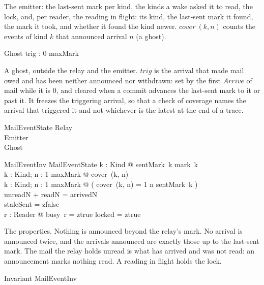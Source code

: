 \documentclass[a4paper,10pt,fleqn]{article}
\begin{document}
The emitter: the last-sent mark per kind, the kinds a wake asked it to read, the
lock, and, per reader, the reading in flight: its kind, the last-sent mark it
found, the mark it took, and whether it found the kind newer.  $cover~(k, n)$ counts the events of kind $k$
that announced arrival $n$ (a ghost).

\begin{schema}{Ghost}
  trig : 0 \upto maxMark
\end{schema}

A ghost, outside the relay and the emitter.  $trig$ is the arrival that made mail
owed and has been neither announced nor withdrawn: set by the first $Arrive$ of mail
while it is $0$, and cleared when a commit advances the last-sent mark to it or
past it.  It freezes the triggering arrival, so that a check of coverage names the
arrival that triggered it and not whichever is the latest at the end of a trace.

\begin{schema}{MailEventState}
  Relay \\
  Emitter \\
  Ghost
\end{schema}

\begin{schema}{MailEventInv}
  MailEventState
  \where
  \forall k : Kind @ sentMark~k \leq mark~k \\
  \forall k : Kind; n : 1 \upto maxMark @ cover~(k, n)  \\
  \forall k : Kind; n : 1 \upto maxMark @
    ( cover~(k, n) = 1 \implies n \leq sentMark~k ) \\
  unreadN + readN = arrivedN \\
  staleSent = zfalse \\
  \forall r : Reader @ busy~r = ztrue \implies locked = ztrue
\end{schema}

The properties.  Nothing is announced beyond the relay's mark.  No arrival is
announced twice, and the arrivals announced are exactly those up to the last-sent
mark.  The mail the relay holds unread is what has arrived and was not read: an
announcement marks nothing read.  A reading in flight holds the lock.

\begin{schema}{Invariant}
  MailEventInv
\end{schema}
\end{document}
